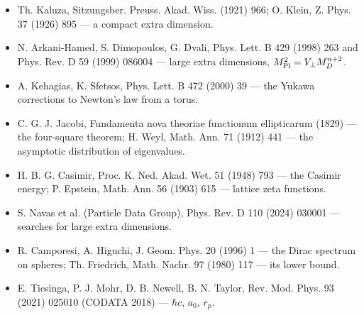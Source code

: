 \documentclass[10pt,a4paper]{article}
\begin{document}
\begin{itemize}
\item Th. Kaluza, Sitzungsber. Preuss. Akad. Wiss. (1921) 966; O. Klein, Z. Phys. 37 (1926) 895 — a compact extra dimension.
\item N. Arkani-Hamed, S. Dimopoulos, G. Dvali, Phys. Lett. B 429 (1998) 263 and Phys. Rev. D 59 (1999) 086004 — large extra dimensions, $M_{\rm Pl}^2=V_\perp M_D^{n+2}$.
\item A. Kehagias, K. Sfetsos, Phys. Lett. B 472 (2000) 39 — the Yukawa corrections to Newton’s law from a torus.
\item C. G. J. Jacobi, Fundamenta nova theoriae functionum ellipticarum (1829) — the four-square theorem; H. Weyl, Math. Ann. 71 (1912) 441 — the asymptotic distribution of eigenvalues.
\item H. B. G. Casimir, Proc. K. Ned. Akad. Wet. 51 (1948) 793 — the Casimir energy; P. Epstein, Math. Ann. 56 (1903) 615 — lattice zeta functions.
\item S. Navas et al. (Particle Data Group), Phys. Rev. D 110 (2024) 030001 — searches for large extra dimensions.
\item R. Camporesi, A. Higuchi, J. Geom. Phys. 20 (1996) 1 — the Dirac spectrum on spheres; Th. Friedrich, Math. Nachr. 97 (1980) 117 — its lower bound.
\item E. Tiesinga, P. J. Mohr, D. B. Newell, B. N. Taylor, Rev. Mod. Phys. 93 (2021) 025010 (CODATA 2018) — $\hbar c$, $a_0$, $r_p$.
\end{itemize}
\end{document}
